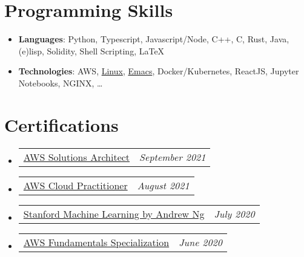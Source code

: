 \documentclass[letterpaper,11pt]{article}
\makeatletter
\newcommand{\resumeItem}[2]{
	\item[]\small{
		\textbf{#1}{: #2 \vspace{-2pt}}
	}
}
\newcommand{\certItem}[2]{
	\vspace{-1pt}\item[]
	\begin{tabular*}{0.96\textwidth}{l@{\extracolsep{\fill}}r}
		#1 & \textit{\small #2} \\
	\end{tabular*}\vspace{-7pt}
}
\newcommand{\resumeSubHeadingListStart}{\begin{itemize}[leftmargin=1mm]}
\newcommand{\resumeSubHeadingListEnd}{\end{itemize}}
\makeatother
\begin{document}
%
\section{Programming Skills}
\resumeSubHeadingListStart{}
\resumeItem{Languages}
{Python, Typescript, Javascript/Node, C++, C, Rust, Java, (e)lisp, Solidity, Shell Scripting, \LaTeX} %
\resumeItem{Technologies}
{AWS, \href{https://github.com/sachiniyer/resume/tree/master/environment}{Linux}, \href{https://github.com/sachiniyer/emacs}{Emacs}, Docker/Kubernetes, ReactJS, Jupyter Notebooks, NGINX, \ldots}
\resumeSubHeadingListEnd{}


\section{Certifications}
\resumeSubHeadingListStart{}
\certItem{\href{https://www.credly.com/badges/ef46fdf4-2c55-474d-a963-9ee14107160f}{AWS Solutions Architect}}
{September 2021}
\certItem{\href{https://www.credly.com/badges/c8d7f47f-c6c1-4af9-8391-5b509b92b271}{AWS Cloud Practitioner}}
{August 2021}
\certItem{\href{https://coursera.org/share/29802cca497e8680b26b241d0ef50b59}{Stanford Machine Learning by Andrew Ng}}
{July 2020}
\certItem{\href{https://coursera.org/share/daef661212dab251985d69e4fb71f730}{AWS Fundamentals Specialization}}
{June 2020}
\resumeSubHeadingListEnd{}

\end{document}
